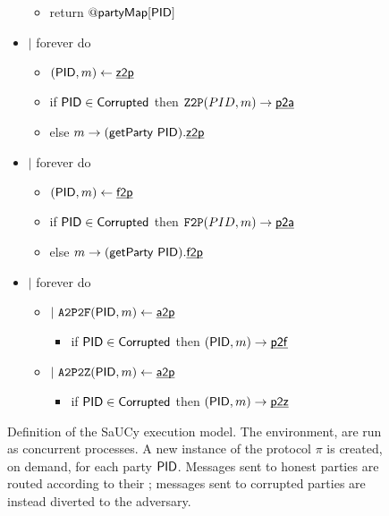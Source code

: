 \begin{figure}[h!]
\begin{boxedminipage}{\columnwidth}
\begin{itemize}[leftmargin=2mm]
\begin{itemize}
  \item[] return $@{\mathsf {partyMap}}[{\mathsf {PID}}]$
  \end{itemize}
\item[] $|$ forever do
  \begin{itemize}[leftmargin=3mm]
  \item[] $({\mathsf {PID}}, m) \leftarrow {\underline{\smash{\ensuremath{{\mathsf {z2p}}}}}}$
  \item[] if ${\mathsf {PID}} \in {\mathsf {Corrupted}}$ then $\mathtt {Z2P}(PID,m) \rightarrow {\underline{\smash{\ensuremath{{\mathsf {p2a}}}}}}$
  \item[] else $m \rightarrow ({\mathsf {getParty}}~{\mathsf {PID}}).{\underline{\smash{{\mathsf {z2p}}}}}$
  \end{itemize}
\item[] $|$ forever do
  \begin{itemize}[leftmargin=3mm]
  \item[] $({\mathsf {PID}}, m) \leftarrow {\underline{\smash{\ensuremath{{\mathsf {f2p}}}}}}$
  \item[] if ${\mathsf {PID}} \in {\mathsf {Corrupted}}$ then $\mathtt {F2P}(PID,m) \rightarrow {\underline{\smash{\ensuremath{{\mathsf {p2a}}}}}}$
  \item[] else $m \rightarrow ({\mathsf {getParty}}~{\mathsf {PID}}).{\underline{\smash{{\mathsf {f2p}}}}}$
  \end{itemize}
\item[] $|$ forever do
  \begin{itemize}[leftmargin=3mm]
  \item[] $|~ \mtt{A2P2F}(\msf{PID}, m) \leftarrow \chan{a2p} $
    \begin{itemize}[leftmargin=2mm]
    \item[] if ${\mathsf {PID}} \in {\mathsf {Corrupted}}$ then $({\mathsf {PID}},m) \rightarrow {\underline{\smash{\ensuremath{{\mathsf {p2f}}}}}}$
    \end{itemize}
  \item[] $|~ \mtt{A2P2Z}(\msf{PID}, m) \leftarrow \chan{a2p} $
    \begin{itemize}[leftmargin=2mm]
    \item[] if ${\mathsf {PID}} \in {\mathsf {Corrupted}}$ then $({\mathsf {PID}},m) \rightarrow {\underline{\smash{\ensuremath{{\mathsf {p2z}}}}}}$
    \end{itemize}
  \end{itemize}
\end{itemize}
\end{boxedminipage}
\caption{
\label{fig:execuc}
Definition of the SaUCy execution model. The environment, are run as concurrent processes. A new instance of the protocol $\pi$ is created, on demand, for each party ${\mathsf {PID}}$. Messages sent to honest parties are routed according to their ; messages sent to corrupted parties are instead diverted to the adversary.
}
\end{figure}
